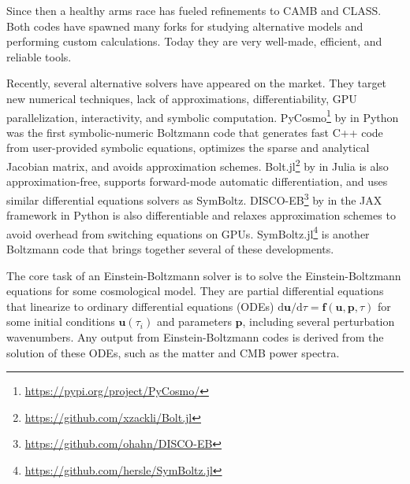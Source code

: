 \documentclass{aa}
\begin{document}
Since then a healthy arms race has fueled refinements to CAMB and CLASS.
Both codes have spawned many forks for studying alternative models and performing custom calculations.
Today they are very well-made, efficient, and reliable tools.

Recently, several alternative solvers have appeared on the market.
They target new numerical techniques, lack of approximations, differentiability, GPU parallelization, interactivity, and symbolic computation.
PyCosmo\footnote{\url{https://pypi.org/project/PyCosmo/}} by \citet{refregierPyCosmoIntegratedCosmological2018} in Python was the first symbolic-numeric Boltzmann code that generates fast C++ code from user-provided symbolic equations, optimizes the sparse and analytical Jacobian matrix, and avoids approximation schemes.
Bolt.jl\footnote{\url{https://github.com/xzackli/Bolt.jl}} by \citet{liBoltjl2023} in Julia is also approximation-free, supports forward-mode automatic differentiation, and uses similar differential equations solvers as SymBoltz.
DISCO-EB\footnote{\url{https://github.com/ohahn/DISCO-EB}} by \citet{hahnDISCODJDifferentiableEinsteinBoltzmann2024} in the JAX framework in Python is also differentiable and relaxes approximation schemes to avoid overhead from switching equations on GPUs.
SymBoltz.jl\footnote{\url{https://github.com/hersle/SymBoltz.jl}} is another Boltzmann code that brings together several of these developments.

The core task of an Einstein-Boltzmann solver is to solve the Einstein-Boltzmann equations for some cosmological model.
They are partial differential equations that linearize to ordinary differential equations (ODEs) ${\mathrm{d}\boldsymbol{u}}/{\mathrm{d} \tau} = \boldsymbol{f}(\boldsymbol{u},\boldsymbol{p},\tau)$ for some initial conditions $\boldsymbol{u}(\tau_i)$ and parameters $\boldsymbol{p}$, including several perturbation wavenumbers.
Any output from Einstein-Boltzmann codes is derived from the solution of these ODEs, such as the matter and CMB power spectra.
\end{document}
